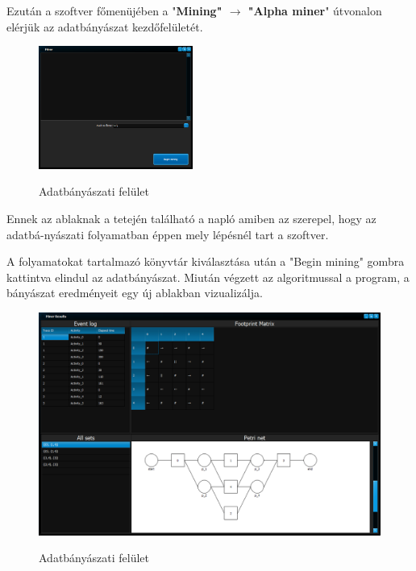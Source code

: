 Ezután a szoftver főmenüjében a "\textbf{Mining" $\rightarrow$ "Alpha miner}" útvonalon elérjük az adatbányászat kezdőfelületét.

\newpage

\begin{figure}[h!]
	\begin{center}
		\caption{Adatbányászati felület}
		\includegraphics[width=0.45\textwidth, keepaspectratio=true]{images/img_datamining_ui}\\
		\label{fig:example}
	\end{center}
\end{figure}

Ennek az ablaknak a tetején található a napló amiben az szerepel, hogy az adatbá\hyp{}nyászati folyamatban éppen mely lépésnél tart a szoftver.

A folyamatokat tartalmazó könyvtár kiválasztása után a "Begin mining" gombra kattintva elindul az adatbányászat. Miután végzett az algoritmussal a program, a bányászat eredményeit egy új ablakban vizualizálja.

\begin{figure}[h!]
	\begin{center}
		\caption{Adatbányászati felület}
		\includegraphics[width=\textwidth, keepaspectratio=true]{images/img_datamining_results}\\
		\label{fig:example}
	\end{center}
\end{figure}




















